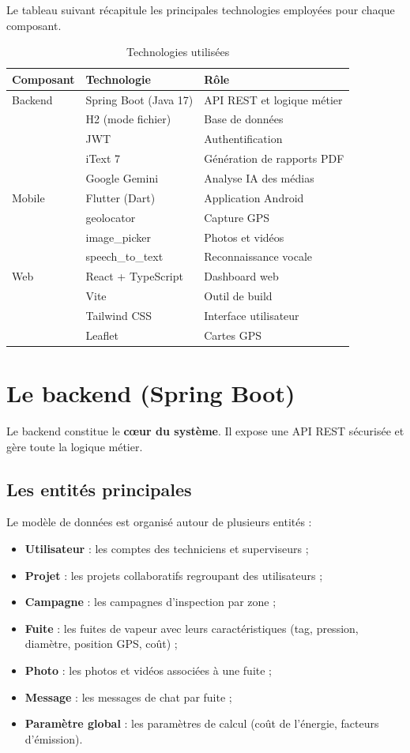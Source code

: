 \documentclass[12pt,a4paper,oneside]{report}
\begin{document}
Le tableau suivant récapitule les principales technologies employées pour chaque composant.

\begin{table}[H]
\centering
\begin{tabular}{@{}lll@{}}
\toprule
\textbf{Composant} & \textbf{Technologie} & \textbf{Rôle} \\
\midrule
Backend & Spring Boot (Java 17) & API REST et logique métier \\
 & H2 (mode fichier) & Base de données \\
 & JWT & Authentification \\
 & iText 7 & Génération de rapports PDF \\
 & Google Gemini & Analyse IA des médias \\
\addlinespace
Mobile & Flutter (Dart) & Application Android \\
 & geolocator & Capture GPS \\
 & image\_picker & Photos et vidéos \\
 & speech\_to\_text & Reconnaissance vocale \\
\addlinespace
Web & React + TypeScript & Dashboard web \\
 & Vite & Outil de build \\
 & Tailwind CSS & Interface utilisateur \\
 & Leaflet & Cartes GPS \\
\bottomrule
\end{tabular}
\caption{Technologies utilisées}
\end{table}

\section{Le backend (Spring Boot)}

Le backend constitue le \textbf{cœur du système}. Il expose une API REST sécurisée et gère toute la logique métier.

\subsection{Les entités principales}

Le modèle de données est organisé autour de plusieurs entités :
\begin{itemize}
    \item \textbf{Utilisateur} : les comptes des techniciens et superviseurs ;
    \item \textbf{Projet} : les projets collaboratifs regroupant des utilisateurs ;
    \item \textbf{Campagne} : les campagnes d'inspection par zone ;
    \item \textbf{Fuite} : les fuites de vapeur avec leurs caractéristiques (tag, pression, diamètre, position GPS, coût) ;
    \item \textbf{Photo} : les photos et vidéos associées à une fuite ;
    \item \textbf{Message} : les messages de chat par fuite ;
    \item \textbf{Paramètre global} : les paramètres de calcul (coût de l'énergie, facteurs d'émission).
\end{itemize}
\end{document}
